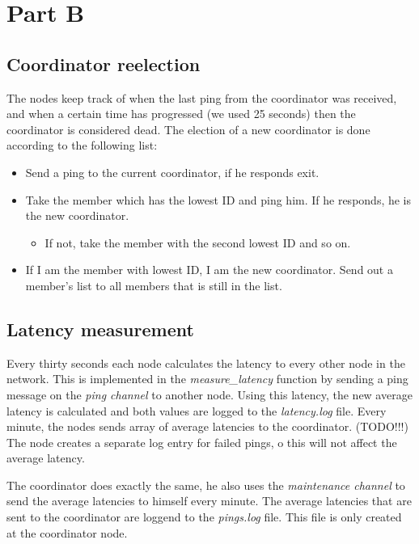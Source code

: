 \documentclass[paper=a4, fontsize=11pt]{scrartcl} %
\numberwithin{equation}{section} %
\numberwithin{figure}{section} %
\numberwithin{table}{section} %
\begin{document}

\section{Part B}


\subsection{Coordinator reelection}
The nodes keep track of when the last ping from the coordinator was received, and when a certain time has progressed (we used 25 seconds) then the coordinator is considered dead. The election of a new coordinator is done according to the following list:
\begin{itemize}
	\item Send a ping to the current coordinator, if he responds exit.
	\item Take the member which has the lowest ID and ping him. If he responds, he is the new coordinator.
	\begin{itemize}
		\item If not, take the member with the second lowest ID and so on.
	\end{itemize}
	\item If I am the member with lowest ID, I am the new coordinator. Send out a member's list to all members that is still in the list.
\end{itemize}


\subsection{Latency measurement}

Every thirty seconds each node calculates the latency to every other node in the network. This is implemented in the \textit{measure\_latency} function by sending a ping message on the \textit{ping channel} to another node. Using this latency, the new average latency is calculated and both values are logged to the \textit{latency.log} file. Every minute, the nodes sends array of average latencies to the coordinator. (TODO!!!) The node creates a separate log entry for failed pings, o this will not affect the average latency.

The coordinator does exactly the same, he also uses the \textit{maintenance channel} to send the average latencies to himself every minute. The average latencies that are sent to the coordinator are loggend to the \textit{pings.log} file. This file is only created at the coordinator node.

\end{document}
